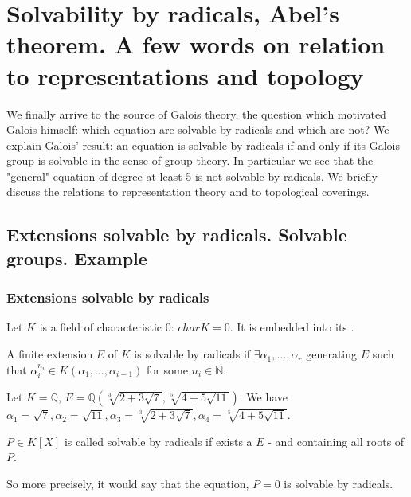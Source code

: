 \chapter{Solvability by radicals, Abel's theorem. A few words on
  relation to representations and topology}

We finally arrive to the source of Galois theory, the question which
motivated Galois himself: which equation are solvable by radicals and
which are not? We explain Galois' result: an equation is solvable by
radicals if and only if its Galois group is solvable in the sense of
group theory. In particular we see that the "general" equation of
degree at least 5 is not solvable by radicals. We briefly discuss the
relations to representation theory and to topological coverings.

\section{Extensions solvable by radicals. Solvable groups. Example} 

\subsection{Extensions solvable by radicals}

Let $K$ is a field of characteristic 0: $char K = 0$. It is embedded
into its .

\begin{definition}
  A finite extension $E$ of $K$ is solvable by radicals if
  $\exists \alpha_1, \dots, \alpha_r$ generating $E$ such that
  $\alpha_i^{n_i} \in K\left(\alpha_1, \dots, \alpha_{i-1}\right)$ for
  some $n_i \in \mathbb{N}$.
  \label{def:solvableextension}
\end{definition}

\begin{example}
  Let $K = \mathbb{Q}$, $E = \mathbb{Q}\left(\sqrt[3]{2 + 3
    \sqrt{7}}, \sqrt[5]{4 + 5 \sqrt{11}}\right)$. We have
    $\alpha_1 = \sqrt{7}, \alpha_2 = \sqrt{11},
    \alpha_3 = \sqrt[3]{2 + 3\sqrt{7}}, \alpha_4 = \sqrt[5]{4 + 5
      \sqrt{11}}$. 
\end{example}

\begin{definition}
  $P \in K\left[X\right]$ is called solvable by radicals if exists a
  $E$ -  and containing all roots of
  $P$. 
  \label{def:solvablepolynomial}
\end{definition}
So more precisely, it would say that the equation, $P = 0$ is solvable
by radicals.

